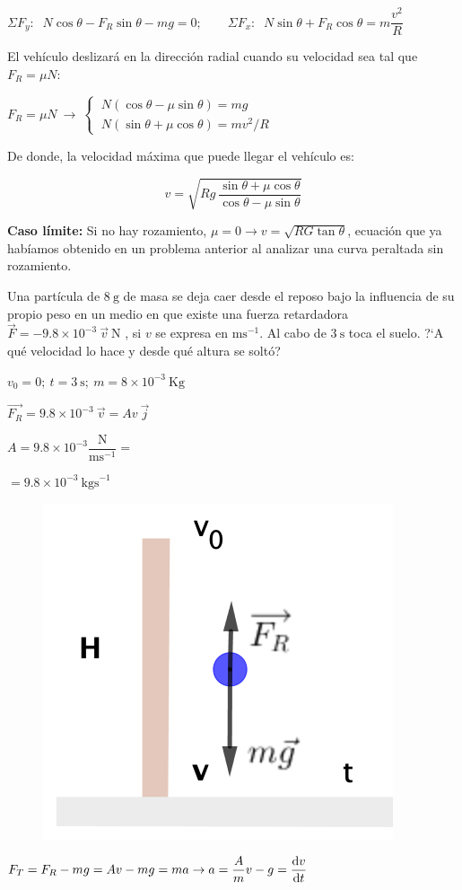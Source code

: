 \noindent $\Sigma F_y:\;\; N\cos \theta-F_R \sin \theta -mg=0;\qquad \Sigma F_x:\;\; N\sin \theta+F_R \cos \theta =m \dfrac {v^2}{R}$

El vehículo deslizará en la dirección radial cuando su velocidad sea tal que $F_R=\mu N$:

$F_R=\mu N \ \to \ \begin{cases} \ N(\cos \theta-\mu \sin \theta)=mg \\ \ N(\sin \theta+\mu \cos \theta)=mv^2/R \end{cases} $


De donde, la velocidad máxima que puede llegar el vehículo es: 

$$ v=\sqrt{Rg \ \dfrac {\sin \theta + \mu \cos \theta} {\cos \theta - \mu \sin \theta}} $$

\textbf{Caso límite:} Si no hay rozamiento, $\mu=0 \to v= \sqrt{RG\tan \theta}$, ecuación que ya habíamos obtenido en un problema anterior al analizar una curva peraltada sin rozamiento.


\begin{prob}
Una partícula de $8 \ \mathrm{g}$  de masa se deja caer desde el reposo bajo la influencia de su propio peso	 en un medio en que existe una fuerza retardadora $\vec F=-9.8\times 10^{-3}\ \vec v\  \mathrm{N}$ , si $v$ se expresa en $\mathrm{ms}^{-1}$. Al cabo de $3\ \mathrm{s}$  toca el suelo. ?`A qué velocidad lo hace y desde qué altura se soltó?
\end{prob}

\begin{multicols}{2}
$v_0=0;\ t=3 \ \mathrm{s};\ m=8\times 10^{-3}\ \textrm{Kg}$

$\overrightarrow{F_R}=9.8\times 10^{-3}\ \vec v=Av\ \vec j$

$ A=9.8\times 10^{-3} \dfrac{\mathrm{N}}{\mathrm{ms}^{-1}}=$

$=9.8\times 10^{-3}\ \mathrm{kgs}^{-1}$
\begin{figure}[H]
	\centering
	\includegraphics[width=.3\textwidth]{imagenes/imagenes09/T09IM11.png}
\end{figure}		
\end{multicols}
$F_T=F_R-mg=Av-mg=ma \to a=\dfrac Am v - g =\displaystyle \dv{v}{t}$

